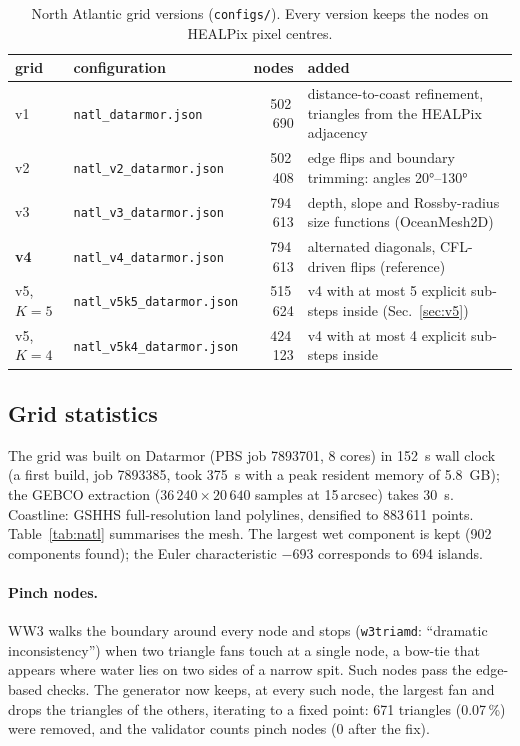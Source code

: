 \documentclass[11pt,a4paper]{article}
\begin{document}
\begin{table}[H]
\centering\small
\begin{tabular}{llrp{6.4cm}}
\toprule
grid & configuration & nodes & added \\
\midrule
v1 & \texttt{natl\_datarmor.json}    & 502\,690 & distance-to-coast refinement, triangles from the HEALPix adjacency \\
v2 & \texttt{natl\_v2\_datarmor.json} & 502\,408 & edge flips and boundary trimming: angles \ang{20}--\ang{130} \\
v3 & \texttt{natl\_v3\_datarmor.json} & 794\,613 & depth, slope and Rossby-radius size functions (OceanMesh2D) \\
\textbf{v4} & \texttt{natl\_v4\_datarmor.json} & 794\,613 & alternated diagonals, CFL-driven flips (reference) \\
v5, $K=5$ & \texttt{natl\_v5k5\_datarmor.json} & 515\,624 & v4 with at most 5 explicit sub-steps inside (Sec.~\ref{sec:v5}) \\
v5, $K=4$ & \texttt{natl\_v5k4\_datarmor.json} & 424\,123 & v4 with at most 4 explicit sub-steps inside \\
\bottomrule
\end{tabular}
\caption{North Atlantic grid versions (\texttt{configs/}). Every version
keeps the nodes on HEALPix pixel centres.}
\label{tab:versions}
\end{table}

\subsection{Grid statistics}
The grid was built on Datarmor (PBS job 7893701, 8 cores) in
\SI{152}{s} wall clock (a first build, job 7893385, took \SI{375}{s} with a
peak resident memory of \SI{5.8}{GB}); the GEBCO extraction
(\(36\,240\times20\,640\) samples at 15\,arcsec) takes \SI{30}{s}.
Coastline: GSHHS full-resolution land polylines, densified to 883\,611
points. Table~\ref{tab:natl} summarises the mesh. The largest wet component
is kept (902 components found); the Euler characteristic $-693$ corresponds
to 694 islands.

\paragraph{Pinch nodes.} WW3 walks the boundary around every node and
stops (\texttt{w3triamd}: ``dramatic inconsistency'') when two triangle
fans touch at a single node, a bow-tie that appears where water lies on two
sides of a narrow spit. Such nodes pass the edge-based checks. The generator
now keeps, at every such node, the largest fan and drops the triangles of
the others, iterating to a fixed point: 671 triangles (0.07\,\%) were
removed, and the validator counts pinch nodes (0 after the fix).
\end{document}
